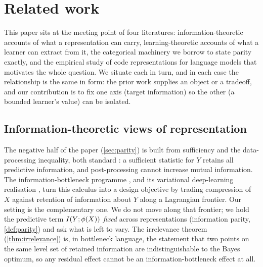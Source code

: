 \section{Related work}
\label{sec:related}


This paper sits at the meeting point of four literatures: information-theoretic
accounts of what a representation can carry, learning-theoretic accounts of what
a learner can extract from it, the categorical machinery we borrow to state
parity exactly, and the empirical study of code representations for language
models that motivates the whole question. We situate each in turn, and in each
case the relationship is the same in form: the prior work supplies an object or a
tradeoff, and our contribution is to fix one axis (target information) so the
other (a bounded learner's value) can be isolated.

\subsection{Information-theoretic views of representation}
\label{subsec:rw-info}

The negative half of the paper (\cref{sec:parity}) is built from sufficiency and
the data-processing inequality, both standard \citep{coverthomas2006,
lehmanncasella1998}: a sufficient statistic for $Y$ retains all predictive
information, and post-processing cannot increase mutual information. The
information-bottleneck programme \citep{tishby2000informationbottleneck}, and its
variational deep-learning realisation \citep{alemi2017deepvib}, turn this calculus
into a design objective by trading compression of $X$ against retention of
information about $Y$ along a Lagrangian frontier. Our setting is the
complementary one. We do not move along that frontier; we hold the predictive
term $I(Y ; \phi(X))$ \emph{fixed} across representations (information parity,
\cref{def:parity}) and ask what is left to vary. The irrelevance theorem
(\cref{thm:irrelevance}) is, in bottleneck language, the statement that two points
on the same level set of retained information are indistinguishable to the Bayes
optimum, so any residual effect cannot be an information-bottleneck effect at all.

